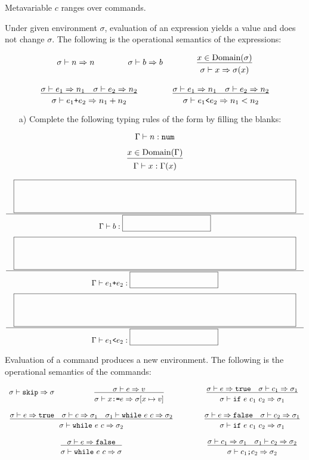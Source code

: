 \begin{enumerate}
Metavariable $c$ ranges over commands.

Under given environment $\sigma$, evaluation of an expression yields a value and does not
change $\sigma$. The following is the operational semantics of the expressions:

\[
\begin{array}{ccc}
\multicolumn{3}{c}{\begin{array}{ccccc}
\sigma\vdash n\Rightarrow n &\qquad&
\sigma\vdash b\Rightarrow b &\qquad&
\newinfrule
{ x\in\Dom{\sigma} }
{ \sigma\vdash x\Rightarrow \sigma(x) }
\end{array}} \\[20pt]
\newinfrule
{ \sigma\vdash e_1\Rightarrow n_1 \rulesep
  \sigma\vdash e_2\Rightarrow n_2 }
{ \sigma\vdash e_1\code{+}e_2\Rightarrow n_1+n_2 }
&\qquad&
\newinfrule
{ \sigma\vdash e_1\Rightarrow n_1 \rulesep
  \sigma\vdash e_2\Rightarrow n_2 }
{ \sigma\vdash e_1\code{<}e_2\Rightarrow n_1<n_2 }
\end{array}
\]

\begin{itemize}
\item[a)] Complete the following typing rules
of the form 
by filling the blanks:
\end{itemize}

{
\[
\Gamma\vdash n:\texttt{num}
\]

\[
\newinfrule
{ x\in\Dom{\Gamma} }
{ \typed{x}{\Gamma(x)} }
\]

\[
\newinfrule
{ \lblank }
{ \typed{b}{\sblank} }
\]
\[
\newinfrule
{ \lblank }
{ \typed{e_1\code{+}e_2}{\sblank} }
\]
\[
\newinfrule
{ \lblank }
{ \typed{e_1\code{<}e_2}{\sblank} }
\]
}

Evaluation of a command produces a new environment.
The following is the operational semantics of the commands:

\[
\begin{array}{ccccc}
\sigma\vdash \code{skip}\Rightarrow \sigma
&\qquad&
\newinfrule
{ \sigma\vdash e\Rightarrow v }
{ \sigma\vdash x\code{:=}e\Rightarrow \sigma[x\mapsto v] }
&\qquad&
\newinfrule
{ \sigma\vdash e\Rightarrow \code{true} \rulesep
  \sigma\vdash c_1\Rightarrow \sigma_1 }
{ \sigma\vdash \code{if}\ e\ c_1\ c_2\Rightarrow \sigma_1 }
\\[20pt]
\multicolumn{3}{c}{
\newinfrule
{ \sigma\vdash e\Rightarrow \code{true} \rulesep
  \sigma\vdash c\Rightarrow \sigma_1 \rulesep
  \sigma_1\vdash \code{while}\ e\ c\Rightarrow \sigma_2 }
{ \sigma\vdash \code{while}\ e\ c\Rightarrow \sigma_2 }
}
&&
\newinfrule
{ \sigma\vdash e\Rightarrow \code{false} \rulesep
  \sigma\vdash c_2\Rightarrow \sigma_1 }
{ \sigma\vdash \code{if}\ e\ c_1\ c_2\Rightarrow \sigma_1 }
\\[20pt]
\multicolumn{3}{c}{
\newinfrule
{ \sigma\vdash e\Rightarrow \code{false} }
{ \sigma\vdash \code{while}\ e\ c\Rightarrow \sigma }
}
&&
\newinfrule
{ \sigma\vdash c_1\Rightarrow \sigma_1 \rulesep
  \sigma_1\vdash c_2\Rightarrow \sigma_2 }
{ \sigma\vdash c_1\code{;}c_2\Rightarrow \sigma_2 }
\end{array}
\]


\end{enumerate}
